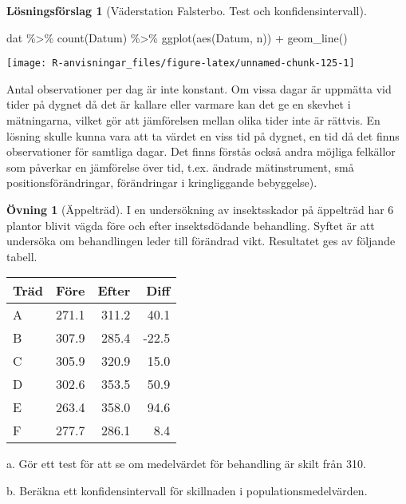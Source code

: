\documentclass[
]{book}
\newenvironment{Shaded}{\begin{snugshade}}{\end{snugshade}}
\newcommand{\FunctionTok}[1]{\textcolor[rgb]{0.00,0.00,0.00}{#1}}
\newcommand{\NormalTok}[1]{#1}
\newcommand{\SpecialCharTok}[1]{\textcolor[rgb]{0.00,0.00,0.00}{#1}}
\theoremstyle{definition}
\theoremstyle{definition}
\theoremstyle{definition}
\newtheorem{exercise}{Övning}[chapter]
\theoremstyle{definition}
\newtheorem{hypothesis}{Lösningsförslag}[chapter]
\theoremstyle{remark}
\begin{document}
\begin{hypothesis}[Väderstation Falsterbo. Test och konfidensintervall]
\begin{Shaded}
\begin{Highlighting}[]
\NormalTok{dat }\SpecialCharTok{\%\textgreater{}\%} \FunctionTok{count}\NormalTok{(Datum) }\SpecialCharTok{\%\textgreater{}\%} \FunctionTok{ggplot}\NormalTok{(}\FunctionTok{aes}\NormalTok{(Datum, n)) }\SpecialCharTok{+} \FunctionTok{geom\_line}\NormalTok{()}
\end{Highlighting}
\end{Shaded}

\begin{center}\texttt{[image: R-anvisningar\_files/figure-latex/unnamed-chunk-125-1]} \end{center}

Antal observationer per dag är inte konstant. Om vissa dagar är uppmätta vid tider på dygnet då det är kallare eller varmare kan det ge en skevhet i mätningarna, vilket gör att jämförelsen mellan olika tider inte är rättvis. En lösning skulle kunna vara att ta värdet en viss tid på dygnet, en tid då det finns observationer för samtliga dagar. Det finns förstås också andra möjliga felkällor som påverkar en jämförelse över tid, t.ex. ändrade mätinstrument, små positionsförändringar, förändringar i kringliggande bebyggelse).
\end{hypothesis}

\begin{exercise}[Äppelträd]
I en undersökning av insektsskador på äppelträd har 6 plantor blivit vägda före och efter insektsdödande behandling. Syftet är att undersöka om behandlingen leder till förändrad vikt. Resultatet ges av följande tabell.

\begin{table}
\centering
\begin{tabular}[t]{lrrr}
\toprule
Träd & Före & Efter & Diff\\
\midrule
A & 271.1 & 311.2 & 40.1\\
B & 307.9 & 285.4 & -22.5\\
C & 305.9 & 320.9 & 15.0\\
D & 302.6 & 353.5 & 50.9\\
E & 263.4 & 358.0 & 94.6\\
\addlinespace
F & 277.7 & 286.1 & 8.4\\
\bottomrule
\end{tabular}
\end{table}

a. Gör ett test för att se om medelvärdet för behandling är skilt från 310.

b. Beräkna ett konfidensintervall för skillnaden i populationsmedelvärden.
\end{exercise}
\end{document}
